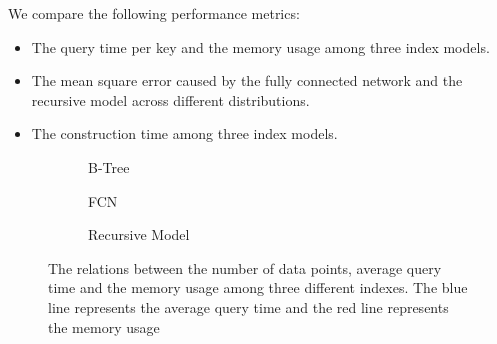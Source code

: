 We compare the following performance metrics:

\begin{itemize}
	\item The query time per key and the memory usage among three index models.
	\item The mean square error caused by the fully connected network and the recursive model across different distributions.
	\item The construction time among three index models.
\end{itemize}

\begin{figure}
 \centering
     \begin{subfigure}[b]{0.28\textwidth}
         \centering
         
         \caption{B-Tree}
         \label{fig:exp2_1_btree}
     \end{subfigure}
     \hfill
     \begin{subfigure}[b]{0.28\textwidth}
         \centering
         
         \caption{FCN}
         \label{fig:exp2_1_fcn}
     \end{subfigure}
     \hfill
     \begin{subfigure}[b]{0.28\textwidth}
         \centering
         
         \caption{Recursive Model}
         \label{fig:exp2_1_rmi}
     \end{subfigure}
        \caption{The relations between the number of data points, average query time and the memory usage among three different indexes. The blue line represents the average query time and the red line represents the memory usage}
        \label{fig:exp2_1}
\end{figure}


